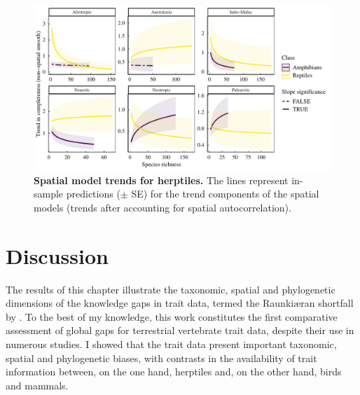 \clearpage
\begin{figure}[h!]
\centering
\includegraphics[scale=0.75]{figures/Chapter1/Figure_6}
\caption[Spatial model trends for herptiles.]{\textbf{Spatial model trends for herptiles.} The lines represent in-sample predictions ($\pm$ SE) for the trend components of the spatial models (trends after accounting for spatial autocorrelation).}
\label{1_Map}
\end{figure}


\section{Discussion}

The results of this chapter illustrate the taxonomic, spatial and phylogenetic dimensions of the knowledge gaps in trait data, termed the Raunkiæran shortfall by \citet{Hortal2015}. To the best of my knowledge, this work constitutes the first comparative assessment of global gaps for terrestrial vertebrate trait data, despite their use in numerous studies. I showed that the trait data present important taxonomic, spatial and phylogenetic biases, with contrasts in the availability of trait information between, on the one hand, herptiles and, on the other hand, birds and mammals.

